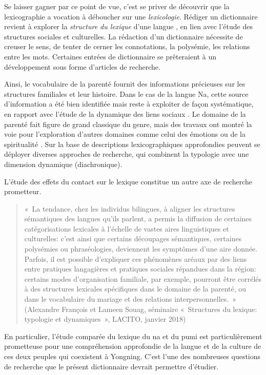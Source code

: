 Se laisser gagner par ce point de vue, c'est se priver de découvrir que la lexicographie a vocation à déboucher sur une \emph{lexicologie}. Rédiger un dictionnaire revient à explorer la \emph{structure du lexique} d'une langue \parencite{francois2008semantic}, en lien avec l'étude des structures sociales et culturelles. La rédaction d'un dictionnaire nécessite de creuser le sens, de tenter de cerner les connotations, la polysémie, les relations entre les mots. Certaines entrées de dictionnaire se prêteraient à un développement sous forme d'articles de recherche.

Ainsi, le vocabulaire de la parenté fournit des informations précieuses sur les structures familiales et leur histoire. Dans le cas de la langue Na, cette source d’information a été bien identifiée \parencite{fu1983} mais reste à exploiter de façon systématique, en rapport avec l'étude de la dynamique des liens sociaux \parencite{milan2021entraide}. Le domaine de la parenté fait figure de grand classique du genre, mais des travaux ont montré la voie pour l’exploration d’autres domaines comme celui des émotions \parencite{tersis_langage_2017} ou de la spiritualité \parencite{francois_shadows_2013}. Sur la base de descriptions lexicographiques approfondies peuvent se déployer diverses approches de recherche, qui combinent la typologie avec une dimension dynamique (diachronique).

L'étude des effets du contact sur le lexique constitue un autre axe de recherche prometteur.

\begin{quote}
« La tendance, chez les individus bilingues, à aligner les structures sémantiques des langues qu’ils parlent, a permis la diffusion de certaines catégorisations lexicales à l’échelle de vastes aires linguistiques et culturelles: c’est ainsi que certains découpages sémantiques, certaines polysémies ou phraséologies, deviennent les symptômes d’une aire donnée. Parfois, il est possible d’expliquer ces phénomènes aréaux par des liens entre pratiques langagières et pratiques sociales répandues dans la région: certains modes d’organisation familiale, par exemple, pourront être corrélés à des structures lexicales spécifiques dans le domaine de la parenté, ou dans le vocabulaire du mariage et des relations interpersonnelles. » (Alexandre François et Lameen Souag, séminaire « Structures du lexique: typologie et dynamiques », LACITO, janvier 2018)
\end{quote}

En particulier, l'étude comparée du lexique du na et du pumi \parencite{daudey2014} est particulièrement prometteuse pour une compréhension approfondie de la langue et de la culture de ces deux peuples qui coexistent à Yongning. C'est l'une des nombreuses questions de recherche que le présent dictionnaire devrait permettre d'étudier.

